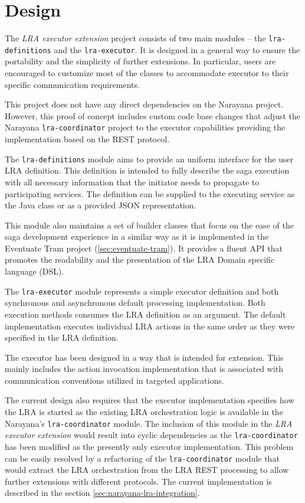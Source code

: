 \documentclass[oneside,
  digital, %
  table,   %
  nolof,     %
  nolot,     %
]{fithesis3}
\begin{document}
\section{Design}
\label{sec:extension-design}

The \textit{LRA executor extension} project consists of two main modules -- the \texttt{lra-definitions} and the \texttt{lra-executor}. It is designed in a general way to ensure the portability and the simplicity of further extensions. In particular, users are encouraged to customize most of the classes to accommodate executor to their specific communication requirements.

This project does not have any direct dependencies on the Narayana project. However, this proof of concept includes custom code base changes that adjust the Narayana \texttt{lra-coordinator} project to the executor capabilities providing the implementation based on the REST protocol.

The \texttt{lra-definitions} module aims to provide an uniform interface for the user LRA definition. This definition is intended to fully describe the saga execution with all necessary information that the initiator needs to propagate to participating services. The definition can be supplied to the executing service as the Java class or as a provided JSON representation.

This module also maintains a set of builder classes that focus on the ease of the saga development experience in a similar way as it is implemented in the Eventuate Tram project (\ref{sec:eventuate-tram}). It provides a fluent API that promotes the readability and the presentation of the LRA Domain specific language (DSL).  

The \texttt{lra-executor} module represents a simple executor definition and both synchronous and asynchronous default processing implementation. Both execution methods consumes the LRA definition as an argument. The default implementation executes individual LRA actions in the same order as they were specified in the LRA definition.

The executor has been designed in a way that is intended for extension. This mainly includes the action invocation implementation that is associated with communication conventions utilized in targeted applications. 

The current design also requires that the executor implementation specifies how the LRA is started as the existing LRA orchestration logic is available in the Narayana's \texttt{lra-coordinator} module. The inclusion of this module in the \textit{LRA executor extension} would result into cyclic dependencies as the \texttt{lra-coordinator} has been modified as the presently only executor implementation. This problem can be easily resolved by a refactoring of the \texttt{lra-coordinator} module that would extract the LRA orchestration from the LRA REST processing to allow further extensions with different protocols. The current implementation is described in the section \ref{sec:narayana-lra-integration}.
\end{document}
